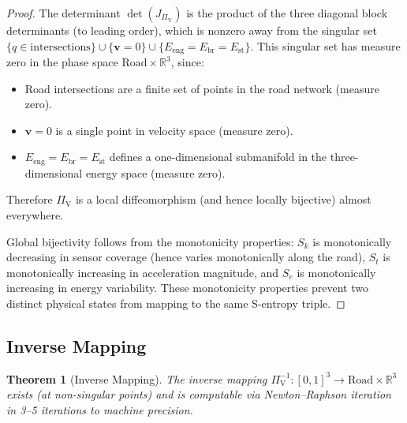 \documentclass[twocolumn,10pt]{article}
\newtheorem{theorem}{Theorem}[section]
\newcommand{\PiV}{\Pi_{\mathrm{V}}}
\newcommand{\Sk}{S_k}
\newcommand{\St}{S_t}
\newcommand{\Se}{S_e}
\begin{document}
\begin{proof}
The determinant $\det(J_{\PiV})$ is the product of the three diagonal block determinants (to leading order), which is nonzero away from the singular set $\{q \in \text{intersections}\} \cup \{\mathbf{v} = 0\} \cup \{E_{\mathrm{eng}} = E_{\mathrm{br}} = E_{\mathrm{st}}\}$. This singular set has measure zero in the phase space $\mathrm{Road} \times \mathbb{R}^3$, since:
\begin{itemize}
    \item Road intersections are a finite set of points in the road network (measure zero).
    \item $\mathbf{v} = 0$ is a single point in velocity space (measure zero).
    \item $E_{\mathrm{eng}} = E_{\mathrm{br}} = E_{\mathrm{st}}$ defines a one-dimensional submanifold in the three-dimensional energy space (measure zero).
\end{itemize}
Therefore $\PiV$ is a local diffeomorphism (and hence locally bijective) almost everywhere.

Global bijectivity follows from the monotonicity properties: $\Sk$ is monotonically decreasing in sensor coverage (hence varies monotonically along the road), $\St$ is monotonically increasing in acceleration magnitude, and $\Se$ is monotonically increasing in energy variability. These monotonicity properties prevent two distinct physical states from mapping to the same S-entropy triple.
\end{proof}

\subsection{Inverse Mapping}

\begin{theorem}[Inverse Mapping]\label{thm:inverse}
The inverse mapping $\PiV^{-1}: [0,1]^3 \to \mathrm{Road} \times \mathbb{R}^3$ exists (at non-singular points) and is computable via Newton--Raphson iteration in 3--5 iterations to machine precision.
\end{theorem}
\end{document}
